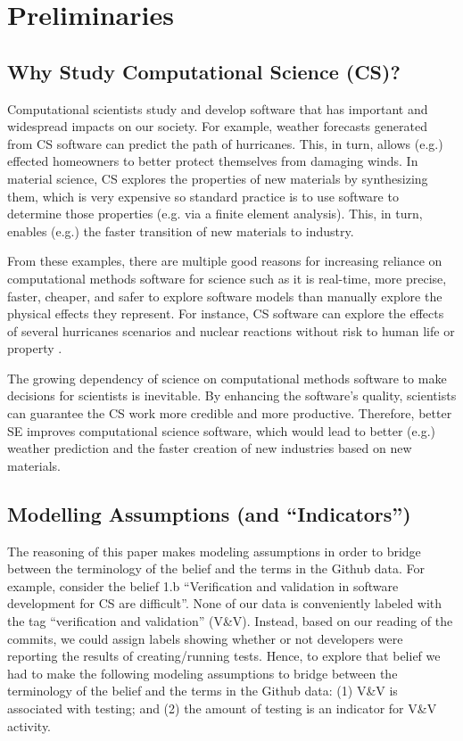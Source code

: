 \documentclass[sigconf,review,anonymous]{acmart}
\begin{document}
 
 

\section{Preliminaries  } 

\subsection{Why Study Computational Science  (CS)?}

Computational scientists study and develop software that has important and widespread impacts on our society. 
For example, weather forecasts generated from CS
software can predict the path of hurricanes. This, in turn,
allows (e.g.) effected homeowners to better protect themselves from
damaging winds. In material science, CS explores the properties
of new materials by synthesizing them, which is very expensive so standard practice is to use software to determine
those properties (e.g. via a finite element analysis). This, in turn, enables (e.g.) the faster transition of new materials to industry.

From these examples, there are multiple good reasons for increasing reliance on computational methods software for science such as it is real-time, more precise, faster, cheaper, and safer to explore software models than manually explore the physical effects they represent. For instance, CS software can explore the effects of several 
hurricanes 
scenarios and nuclear reactions without risk to human life
or property \cite{heaton15_lit}. 

The growing dependency of science on computational methods software to make decisions for scientists is inevitable. By enhancing the software's quality, scientists can guarantee the CS work more credible and more productive. Therefore, 
better SE improves computational
science software, which would lead to better (e.g.) weather prediction and the faster creation of new industries based on new materials.

\subsection{Modelling Assumptions (and ``Indicators'')}\label{model}

 
The reasoning of this 
paper makes
modeling assumptions in order to bridge between the terminology of the belief and the terms in the Github data.  For example, consider the belief 1.b ``Verification and validation in software development for CS are difficult''.  
None of our data is conveniently labeled with the tag ``verification and validation'' (V\&V). Instead, based on our reading of the commits, we could assign labels showing whether or not developers were reporting the results of creating/running tests. Hence, to explore that belief we had to make the following modeling assumptions to bridge between the terminology of the belief and the terms in the Github data: (1) V\&V is associated with testing; and (2) the amount of testing is an indicator for V\&V activity.
\end{document}
